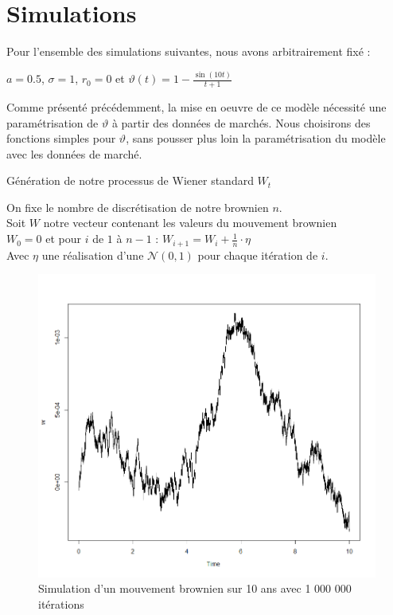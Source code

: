 \documentclass[11pt]{article}
\let\vega\vartheta
\begin{document}
\section{Simulations}
Pour l'ensemble des simulations suivantes, nous avons arbitrairement fixé :\\
\begin{center}
$a=0.5$, $\sigma=1$, $r_0 = 0$ et $\vega(t) = 1-\frac{\sin(10t)}{t+1}$
\end{center}
Comme présenté précédemment, la mise en oeuvre de ce modèle nécessité une paramétrisation de $\vega$ à partir des données de marchés. Nous choisirons des fonctions simples pour $\vega$, sans pousser plus loin la paramétrisation du modèle avec les données de marché.
\begin{algorithm}[H]
\caption{Génération de notre processus de Wiener standard $W_{t}$}
On fixe le nombre de discrétisation de notre brownien $n$.\\
Soit $W$ notre vecteur contenant les valeurs du mouvement brownien\\
$W_{0}=0$ et pour $i$ de $1$ à $n-1$ : $W_{i+1} = W_{i} + \frac{1}{n} \cdot \eta$\\
Avec $\eta$ une réalisation d'une $\mathcal{N}(0,1)$ pour chaque itération de $i$.\\
\end{algorithm}

\begin{figure}[H]
         \centering \includegraphics[scale=0.55]{graphbrown}
        \caption{Simulation d'un mouvement brownien sur 10 ans avec 1 000 000 itérations}
\end{figure}
\end{document}
